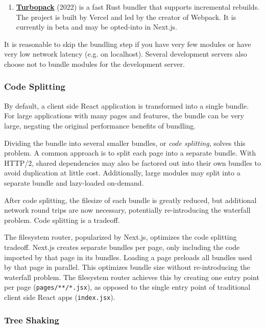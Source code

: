 \documentclass{article}
\newcommand{\ti}{\textit}
\newcommand{\tb}{\textbf}
\newcommand{\tc}{\texttt}
\begin{document}
\begin{enumerate}
  \item \href{https://turbo.build/pack}{\tb{Turbopack}} (2022) is a fast Rust bundler that supports
    incremental rebuilds. The project is built by Vercel and led by the creator of Webpack. It is
    currently in beta and may be opted-into in Next.js.
\end{enumerate}

It is reasonable to skip the bundling step if you have very few modules or have very low network
latency (e.g. on localhost). Several development servers also choose not to bundle modules for the
development server.

\hypertarget{code-splitting}{
\subsubsection{Code Splitting}
}

By default, a client side React application is transformed into a single bundle. For large
applications with many pages and features, the bundle can be very large, negating the original
performance benefits of bundling.

Dividing the bundle into several smaller bundles, or \ti{code splitting}, solves this problem. A
common approach is to split each page into a separate bundle. With HTTP/2, shared dependencies may
also be factored out into their own bundles to avoid duplication at little cost. Additionally, large
modules may split into a separate bundle and lazy-loaded on-demand.

After code splitting, the filesize of each bundle is greatly reduced, but additional network round
trips are now necessary, potentially re-introducing the waterfall problem. Code splitting is a
tradeoff.

The filesystem router, popularized by Next.js, optimizes the code splitting tradeoff. Next.js
creates separate bundles per page, only including the code imported by that page in its bundles.
Loading a page preloads all bundles used by that page in parallel. This optimizes bundle size
without re-introducing the waterfall problem. The filesystem router achieves this by creating one
entry point per page (\tc{pages/**/*.jsx}), as opposed to the single entry point of traditional
client side React apps (\tc{index.jsx}).

\hypertarget{tree-shaking}{
\subsubsection{Tree Shaking}
}
\end{document}
